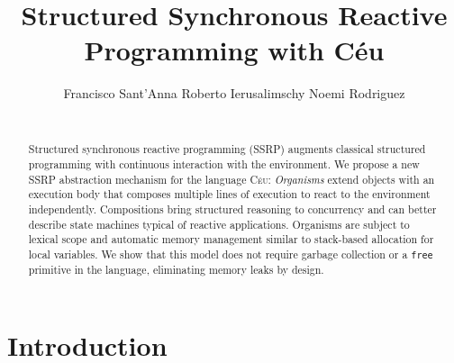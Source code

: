 \documentclass{acm_proc_article-sp}
\newcommand{\CEU}{\textsc{C\'{e}u}\xspace}
\newcommand{\code}[1] {{\small{\texttt{#1}}}}
\newcommand{\1}{\;}
\newcommand{\2}{\;\;}
\newcommand{\3}{\;\;\;}
\newcommand{\5}{\;\;\;\;\;}
\begin{document}
\sloppy

\title {
    Structured Synchronous Reactive Programming with C\'eu
}

\author{
    \alignauthor
    Francisco Sant'Anna \hspace{1cm} Roberto Ierusalimschy  \hspace{1cm} Noemi Rodriguez  \\
     \\
}

\maketitle

\begin{abstract}
Structured synchronous reactive programming (SSRP) augments classical 
structured programming with continuous interaction with the environment.
%
We propose a new SSRP abstraction mechanism for the language \CEU:
%
\emph{Organisms} extend objects with an execution body that composes multiple 
lines of execution to react to the environment independently.
%
Compositions bring structured reasoning to concurrency and can better describe 
state machines typical of reactive applications.
%
Organisms are subject to lexical scope and automatic memory management similar 
to stack-based allocation for local variables.
We show that this model does not require garbage collection or a \code{free} 
primitive in the language, eliminating memory leaks by design.
\end{abstract}




\section{Introduction}
\label{sec.intro}
\end{document}
